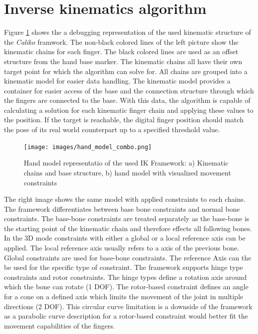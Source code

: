 \section{Inverse kinematics algorithm}
Figure \ref{img:hand-constraint_debug_view} shows the a debugging representation of the used kinematic structure of the \textit{Caliko} framwork. The non-black colored lines of the left picture show the kinematic chains for each finger. The black colored lines are used as an offset structure from the hand base marker.
The kinematic chains all have their own target point for which the algorithm can solve for. All chains are grouped into a kinematic model for easier data handling. The kinematic model provides a container for easier access of the base and the connection structure through which the fingers are connected to the base.
With this data, the algorithm is capable of calculating a solution for each kinematic finger chain and applying these values to the position. If the target is reachable, the digital finger position should match the pose of its real world counterpart up to a specified threshold value.
\begin{figure}[H]
\centering
\texttt{[image: images/hand\_model\_combo.png]}
\caption{Hand model representatio of the used IK Framework: a) Kinematic chains and base structure, b) hand model with visualized movement constraints}
\label{img:hand-constraint_debug_view} 
\end{figure}
The right image shows the same model with applied constraints to each chains. The framework differentiates between base bone constraints and normal bone constraints. The base-bone constraints are treated separately as the base-bone is the starting point of the kinematic chain and therefore effects all following bones. In the 3D mode constraints with either a global or a local reference axis can be applied. The local reference axis usually refers to a axis of the previous bone. Global constraints are used for base-bone constraints. The reference Axis can the be used for the specific type of constraint. The framework supports hinge type constraints and rotor constraints. The hinge types define a rotation axis around which the bone can rotate (1 DOF). The rotor-based constraint defines an angle for a cone on a defined axis which limits the movement of the joint in multiple directions (2 DOF). This circular curve limitation  is a downside of the framework as a parabolic curve description for a rotor-based constraint would better fit the movement capabilities of the fingers.

